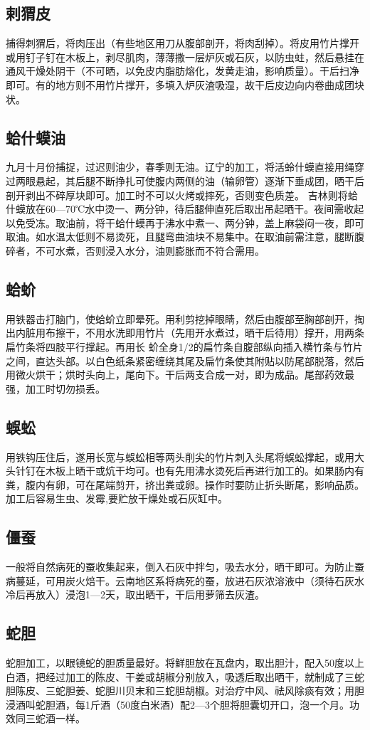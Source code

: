 \documentclass{ctexbook}
\begin{document}
\subsection{剌猬皮}
捕得刺猬后，将肉压出（有些地区用刀从腹部剖开，将肉刮掉）。将皮用竹片撑开或用钉子钉在木板上，剥尽肌肉，薄薄撒一层炉灰或石灰，以防虫蛀，然后悬挂在通风干燥处阴干（不可晒，以免皮内脂肪熔化，发黄走油，影响质量）。干后扫净即可。有的地方则不用竹片撑开，多填入炉灰渣吸湿，故干后皮边向内卷曲成团块状。
\subsection{蛤什蟆油}
九月十月份捕捉，过迟则油少，春季则无油。辽宁的加工，将活蛉什蟆直接用绳穿过两眼悬起，其后腿不断挣扎可使腹内两侧的油（输卵管）逐渐下垂成团，晒干后剖开剥出不碎厚块即可。加工时不可以火烤或摔死，否则变色质差。
吉林则将蛤什蟆放在60—70℃水中烫一、两分钟，待后腿伸直死后取出吊起晒干。夜间需收起以免受冻。取油前，将干蛤什蟆再于沸水中煮一、两分钟，盖上麻袋闷一夜，即可取油。如水温太低则不易烫死，且腿弯曲油块不易集中。在取油前需注意，腿断腹碎者，不可水煮，否则浸入水分，油则膨胀而不符合需用。
\subsection{蛤蚧}
用铁器击打脑门，使蛤蚧立即晕死。用利剪挖掉眼睛，然后由腹部至胸部剖开，掏出内脏用布擦干，不用水洗即用竹片（先用开水煮过，晒干后待用）撑开，用两条扁竹条将四肢平行撑起。再用长
蚧全身1/2的扁竹条自腹部纵向插入横竹条与竹片之间，直达头部。以白色纸条紧密缠绕其尾及扁竹条使其附贴以防尾部脱落，然后用微火烘干；烘时头向上，尾向下。干后两支合成一对，即为成品。尾部药效最强，加工时切勿损丢。
\subsection{蜈蚣}
用铁钩压住后，遂用长宽与蜈蚣相等两头削尖的竹片刺入头尾将蜈蚣撑起，或用大头针钉在木板上晒干或炕干均可。也有先用沸水烫死后再进行加工的。如果肠内有粪，腹内有卵，可在尾端剪开，挤出粪或卵。操作时要防止折头断尾，影响品质。加工后容易生虫、发霉,要贮放干燥处或石灰缸中。
\subsection{僵蚕}
一般将自然病死的蚕收集起来，倒入石灰中拌匀，吸去水分，晒干即可。为防止蚕病蔓延，可用炭火焙干。云南地区系将病死的蚕，放进石灰浓溶液中（须待石灰水冷后再放入）浸泡1—2天，取出晒干，干后用萝筛去灰渣。
\subsection{蛇胆}
蛇胆加工，以眼镜蛇的胆质量最好。将鲜胆放在瓦盘内，取出胆汁，配入50度以上白酒，把经过加工的陈皮、干姜或胡椒分别放入，吸透后取出晒干，就制成了三蛇胆陈皮、三蛇胆姜、蛇胆川贝末和三蛇胆胡椒。对治疗中风、祛风除痰有效；用胆浸酒叫蛇胆酒，每1斤酒（50度白米酒）配2—3个胆将胆囊切开口，泡一个月。功效同三蛇酒一样。
\end{document}
